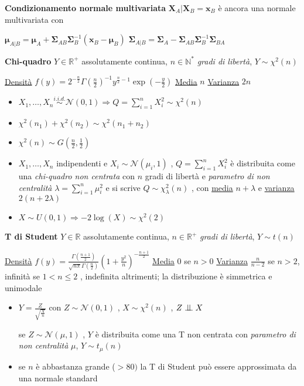 \documentclass[openany]{book} %
\newcommand{\ind}{\mathrel{\text{\scalebox{1.07}{$\perp\mkern-10mu\perp$}}}}
\begin{document}
\textbf{Condizionamento normale multivariata} $\boldsymbol{X}_A|\boldsymbol{X}_B=\boldsymbol{x}_B$ è ancora una normale multivariata con

$\boldsymbol{\mu}_{A|B} = \boldsymbol{\mu}_A+\boldsymbol{\Sigma}_{AB}\boldsymbol{\Sigma}^{-1}_B(\boldsymbol{x}_B-\boldsymbol{\mu}_B)$ \quad $\boldsymbol{\Sigma}_{A|B} = \boldsymbol{\Sigma}_{A}-\boldsymbol{\Sigma}_{AB}\boldsymbol{\Sigma}^{-1}_B\boldsymbol{\Sigma}_{BA}$

\textbf{Chi-quadro} $Y \in \mathbb{R}^+$ assolutamente continua, $n\in \mathbb{N}^*$ \textit{gradi di libertà}, $Y\sim\chi^2(n)$

\underline{Densità} $f(y)=2^{-\frac{n}{2}}\Gamma(\frac{n}{2})^{-1}y^{\frac{n}{2}-1}\exp(-\frac{y}{2})$ \qquad \underline{Media} $n$ \qquad \underline{Varianza} $2n$

\begin{itemize}

	\item $X_1,\dots,X_n \overset{i.i.d.}{\sim}\mathcal{N}(0,1)\Rightarrow Q=\sum_{i=1}^nX_i^2\sim\chi^2(n)$

	\item $\chi^2(n_1)+\chi^2(n_2)\sim\chi^2(n_1+n_2)$

	\item $\chi^2(n)\sim G(\frac{n}{2},\frac{1}{2})$

	\item $X_1,\dots,X_n$ indipendenti e $X_i\sim\mathcal{N}(\mu_i,1)$ , $Q=\sum_{i=1}^nX_i^2$ è distribuita come una \textit{chi-quadro non centrata} con $n$ gradi di libertà e \textit{parametro di non centralità} $\lambda=\sum_{i=1}^n\mu_i^2$ e si scrive $Q\sim\chi^2_\lambda(n)$ , con \underline{media} $n+\lambda$ e \underline{varianza} $2(n+2\lambda)$

	\item $X\sim U(0,1)\Rightarrow-2\log(X)\sim\chi^2(2)$

\end{itemize}

\textbf{T di Student} $Y\in \mathbb{R}$ assolutamente continua, $n\in \mathbb{R}^+$ \textit{gradi di libertà}, $Y\sim t(n)$

\underline{Densità} $f(y)=\frac{\Gamma(\frac{n+1}{2})}{\sqrt{n\pi}\Gamma(\frac{n}{2})}(1+\frac{y^2}{n})^{-\frac{n+1}{2}}$ \qquad \underline{Media} 0 se $n>0$ \qquad \underline{Varianza} $\frac{n}{n-2}$ se $n>2$, infinità se $1<n\leq2$ , indefinita altrimenti; la distribuzione è simmetrica e unimodale

\begin{itemize}

	\item $Y= \frac{Z}{\sqrt{\frac{X}{n}}}$ con $Z\sim \mathcal{N}(0,1)$ , $X\sim\chi^2(n)$ , $Z\ind X$

	      se $Z\sim \mathcal{N}(\mu,1)$ , $Y$ è distribuita come una T non centrata con \textit{parametro di non centralità} $\mu$, $Y\sim t_\mu(n)$

	\item se $n$ è abbastanza grande ($>80)$ la T di Student può essere approssimata da una normale standard

\end{itemize}
\end{document}
